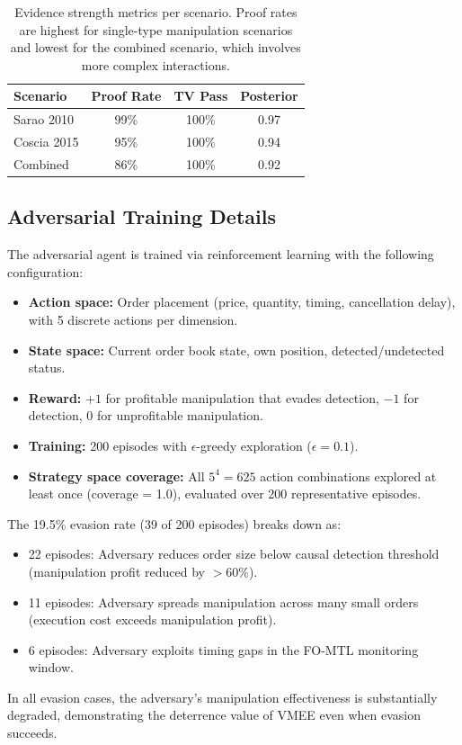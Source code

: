 \documentclass[11pt]{article}
\begin{document}
\begin{table}[h]
\centering
\begin{tabular}{@{}lccc@{}}
\toprule
\textbf{Scenario} & \textbf{Proof Rate} & \textbf{TV Pass} & \textbf{Posterior} \\
\midrule
Sarao 2010   & 99\% & 100\% & 0.97 \\
Coscia 2015  & 95\% & 100\% & 0.94 \\
Combined     & 86\% & 100\% & 0.92 \\
\bottomrule
\end{tabular}
\caption{Evidence strength metrics per scenario. Proof rates are highest for single-type manipulation scenarios and lowest for the combined scenario, which involves more complex interactions.}
\label{tab:evidence-detail}
\end{table}

\subsection{Adversarial Training Details}

The adversarial agent is trained via reinforcement learning with the following configuration:
\begin{itemize}[nosep]
  \item \textbf{Action space:} Order placement (price, quantity, timing, cancellation delay), with 5 discrete actions per dimension.
  \item \textbf{State space:} Current order book state, own position, detected/undetected status.
  \item \textbf{Reward:} $+1$ for profitable manipulation that evades detection, $-1$ for detection, $0$ for unprofitable manipulation.
  \item \textbf{Training:} 200 episodes with $\epsilon$-greedy exploration ($\epsilon = 0.1$).
  \item \textbf{Strategy space coverage:} All $5^4 = 625$ action combinations explored at least once (coverage = 1.0), evaluated over 200 representative episodes.
\end{itemize}

The 19.5\% evasion rate (39 of 200 episodes) breaks down as:
\begin{itemize}[nosep]
  \item 22 episodes: Adversary reduces order size below causal detection threshold (manipulation profit reduced by $> 60\%$).
  \item 11 episodes: Adversary spreads manipulation across many small orders (execution cost exceeds manipulation profit).
  \item 6 episodes: Adversary exploits timing gaps in the FO-MTL monitoring window.
\end{itemize}
In all evasion cases, the adversary's manipulation effectiveness is substantially degraded, demonstrating the deterrence value of VMEE even when evasion succeeds.
\end{document}
